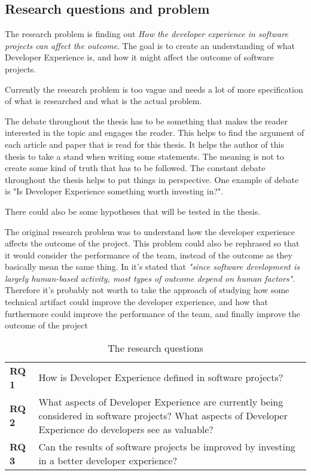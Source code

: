 \documentclass[english, 12pt, a4paper, sci, utf8, a-1b, online]{aaltothesis}
\begin{document}
\subsection{Research questions and problem}

The research problem is finding out \textit{How the developer experience in software projects can affect the outcome}. The goal is to create an understanding of what Developer Experience is, and how it might affect the outcome of software projects.

  {
    \color{gray}
    Currently the research problem is too vague and needs a lot of more specification of what is researched and what is the actual problem.

    The debate throughout the thesis has to be something that makes the reader interested in the topic and engages the reader. This helps to find the argument of each article and paper that is read for this thesis. It helps the author of this thesis to take a stand when writing some statements. The meaning is not to create some kind of truth that has to be followed. The constant debate throughout the thesis helps to put things in perspective. One example of debate is "Is Developer Experience something worth investing in?".

    There could also be some hypotheses that will be tested in the thesis.

    The original research problem was to understand how the developer experience affects the outcome of the project. This problem could also be rephrased so that it would consider the performance of the team, instead of the outcome as they basically mean the same thing. In \cite{how-developers-experience-team-performance} it's stated that \textit{"since software development is largely human-based activity, most types of outcome depend on human factors"}. Therefore it's probably not worth to take the approach of studying how some technical artifact could improve the developer experience, and how that furthermore could improve the performance of the team, and finally improve the outcome of the project
  }

\begin{table}[htb]
  \caption{The research questions \label{researchquestions}}
  \begin{center}
    \begin{tabularx}{\textwidth}{lX}
      \textbf{RQ 1} & How is Developer Experience defined in software projects?
      \\
      \textbf{RQ 2} & What aspects of Developer Experience are currently being considered in software projects? What aspects of Developer Experience do developers see as valuable?
      \\
      \textbf{RQ 3} & Can the results of software projects be improved by investing in a better developer experience?
    \end{tabularx}
  \end{center}
\end{table}
\end{document}
